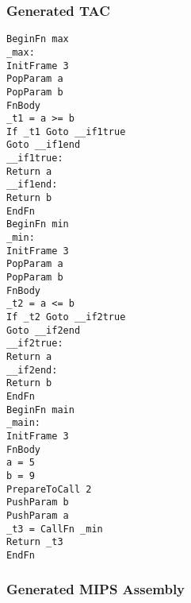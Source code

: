 \subsubsection{Generated TAC}
\begin{lstlisting}[showstringspaces=false,breaklines=true,backgroundcolor=\color{light-gray}, captionpos=b]
BeginFn max
_max:
InitFrame 3
PopParam a
PopParam b
FnBody
_t1 = a >= b
If _t1 Goto __if1true
Goto __if1end
__if1true:
Return a
__if1end:
Return b
EndFn
BeginFn min
_min:
InitFrame 3
PopParam a
PopParam b
FnBody
_t2 = a <= b
If _t2 Goto __if2true
Goto __if2end
__if2true:
Return a
__if2end:
Return b
EndFn
BeginFn main
_main:
InitFrame 3
FnBody
a = 5
b = 9
PrepareToCall 2
PushParam b
PushParam a
_t3 = CallFn _min
Return _t3
EndFn

\end{lstlisting}\subsubsection{Generated MIPS Assembly}
